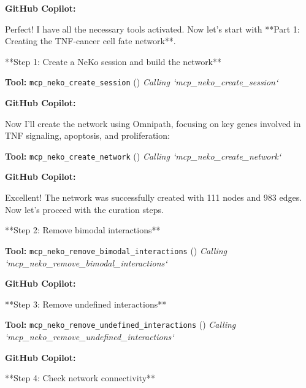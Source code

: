 \documentclass[11pt,a4paper]{article}
\begin{document}
\begin{copilotbox}
\textbf{GitHub Copilot:}

Perfect! I have all the necessary tools activated. Now let's start with **Part 1: Creating the TNF-cancer cell fate network**.

**Step 1: Create a NeKo session and build the network**

\end{copilotbox}
\begin{toolokbox}
\textbf{Tool:} \texttt{mcp\_neko\_create\_session} (\checkmark)
\textit{Calling `mcp\_neko\_create\_session`}
\end{toolokbox}
\begin{copilotbox}
\textbf{GitHub Copilot:}

Now I'll create the network using Omnipath, focusing on key genes involved in TNF signaling, apoptosis, and proliferation:

\end{copilotbox}
\begin{toolokbox}
\textbf{Tool:} \texttt{mcp\_neko\_create\_network} (\checkmark)
\textit{Calling `mcp\_neko\_create\_network`}
\end{toolokbox}
\begin{copilotbox}
\textbf{GitHub Copilot:}

Excellent! The network was successfully created with 111 nodes and 983 edges. Now let's proceed with the curation steps.

**Step 2: Remove bimodal interactions**

\end{copilotbox}
\begin{toolokbox}
\textbf{Tool:} \texttt{mcp\_neko\_remove\_bimodal\_interactions} (\checkmark)
\textit{Calling `mcp\_neko\_remove\_bimodal\_interactions`}
\end{toolokbox}
\begin{copilotbox}
\textbf{GitHub Copilot:}

**Step 3: Remove undefined interactions**

\end{copilotbox}
\begin{toolokbox}
\textbf{Tool:} \texttt{mcp\_neko\_remove\_undefined\_interactions} (\checkmark)
\textit{Calling `mcp\_neko\_remove\_undefined\_interactions`}
\end{toolokbox}
\begin{copilotbox}
\textbf{GitHub Copilot:}

**Step 4: Check network connectivity**

\end{copilotbox}
\end{document}
